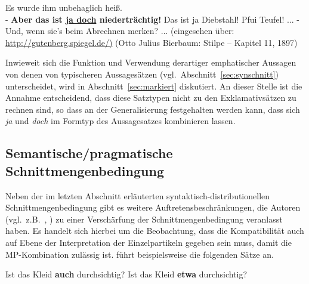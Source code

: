 \begin{exe}
	\ex\label{313} 

	Es wurde ihm unbehaglich heiß.\\
	- \textbf{Aber das ist \underline{ja doch} niederträchtig!} Das ist ja Diebstahl! Pfui Teufel! ...
	- Und, wenn sie's beim Abrechnen merken? ...
	\newline
	{\scriptsize(eingesehen über: \url{http://gutenberg.spiegel.de/)}}
	\newline
	\hbox{}\hfill(Otto Julius Bierbaum: Stilpe – Kapitel 11, 1897) 
\end{exe}								                       
Inwieweit sich die Funktion und Verwendung derartiger emphatischer Aussagen von denen von typischeren Aussagesätzen (vgl.\ Abschnitt~\ref{sec:synschnitt}) unterscheidet, wird in Abschnitt~\ref{sec:markiert} diskutiert. An dieser Stelle ist die Annahme entscheidend, dass diese Satztypen nicht zu den Exklamativsätzen zu rechnen sind, so dass an der Generalisierung festgehalten werden kann, dass sich \textit{ja} und \textit{doch} im Formtyp des Aussagesatzes kombinieren lassen.

\subsection{Semantische/pragmatische Schnittmengenbedingung}
Neben der im letzten Abschnitt erläuterten syntaktisch-distributionellen Schnitt\-mengenbedingung gibt es weitere Auftretensbeschränkungen, die Autoren (vgl.\ z.B.\ \citealt[218, 222--223]{Dahl1988}, \citealt[25--31]{Thurmair1991}) zu einer Verschärfung der Schnittmengenbedingung veranlasst haben. Es handelt sich hierbei um die Beobachtung, dass die Kompatibilität auch auf Ebene der Interpretation der Einzelpartikeln gegeben sein muss, damit die MP-Kombination zulässig ist. \citet[26--27]{Thurmair1991} führt beispielsweise die folgenden Sätze an.	 

\begin{exe}
	\ex\label{314} 
		\begin{xlist}	
			\ex\label{314a} Ist das Kleid \textbf{auch} durchsichtig?
			\ex\label{314b} Ist das Kleid \textbf{etwa} durchsichtig?
		\end{xlist}
\end{exe}

